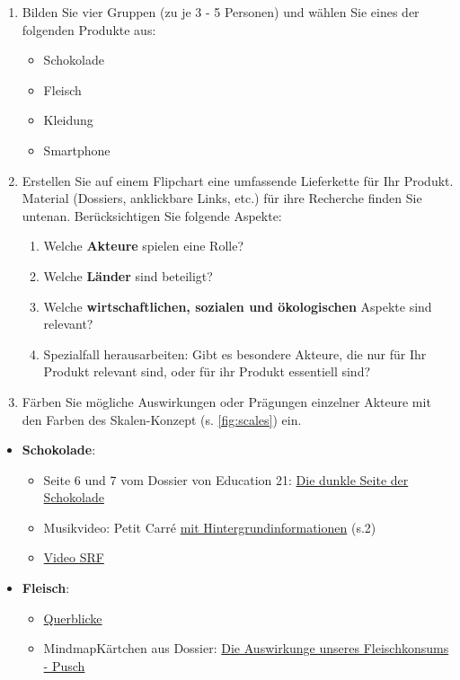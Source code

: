 \begin{myexercise}
\begin{enumerate}
\item Bilden Sie vier Gruppen (zu je 3 - 5 Personen) und wählen Sie eines der folgenden Produkte aus:
\begin{itemize}
\item Schokolade
\item Fleisch
\item Kleidung
\item Smartphone
\end{itemize}

\item Erstellen Sie auf einem Flipchart eine umfassende Lieferkette für Ihr Produkt. Material (Dossiers, anklickbare Links, etc.) für ihre Recherche finden Sie untenan.
Berücksichtigen Sie folgende Aspekte:
\begin{enumerate}
\item Welche \textbf{Akteure} spielen eine Rolle? 
\item Welche \textbf{Länder} sind beteiligt? 
\item Welche \textbf{wirtschaftlichen, sozialen und ökologischen} Aspekte sind relevant?
\item Spezialfall herausarbeiten: Gibt es besondere Akteure, die nur für Ihr Produkt relevant sind, oder für ihr Produkt essentiell sind?
\end{enumerate}
\item Färben Sie mögliche Auswirkungen oder Prägungen einzelner Akteure mit den Farben des Skalen-Konzept (s. \cref{fig:scales}) ein. 
\end{enumerate} 

\begin{textBox}[title=Hintergrund-Informationen und Recherche-Materialien]
\begin{itemize}
	\item \textbf{Schokolade}:
	\begin{itemize}
	\item Seite 6 und 7 vom Dossier von Education 21: \href{https://www.education21.ch/sites/default/files/uploads/pdf-d/bne-kit/BNE-Kit_Chocolat_Cycle 3_DE_201016.pdf}{Die dunkle Seite der Schokolade}
	\item Musikvideo: Petit Carré \href{https://www.youtube.com/watch?v=1MCYpsGFv_s&ab_channel=JonasMusic}{mit Hintergrundinformationen} (s.2)
		\item \href{https://www.srf.ch/play/tv/rundschau/video/die-spur-des-kakao-kinderarbeit-auf-der-plantage?urn=urn%3Asrf%3Avideo%3A71e90aae-c17b-4213-a36b-c32566568b2c}{Video SRF}
	\end{itemize}
	\item \textbf{Fleisch}:
	\begin{itemize}
	\item \href{https://querblicke.ch/7-rind-und-fleisch/}{Querblicke}
	\item MindmapKärtchen aus Dossier: \href{https://www.pusch.ch/fileadmin/kundendaten/de/Schule/Unterrichtsvorschlaege/Abfall_Konsum_Littering/05_Konsum/Die_Auswirkungen_unseres_Fleischkonsums_OS.pdf}{Die Auswirkunge unseres Fleischkonsums - Pusch}
	\end{itemize}


\end{itemize}
\end{textBox}
\end{myexercise}
